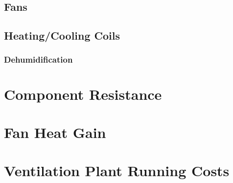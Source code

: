 \subsection{Fans}



\subsection{Heating/Cooling Coils}



\subsubsection{Dehumidification}



\section{Component Resistance}



\section{Fan Heat Gain}
\label{sec:FanHeatGain}



\section{Ventilation Plant Running Costs}
\label{sec:VentPlantRunningCosts}

